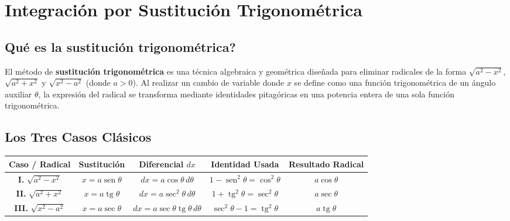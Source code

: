 \documentclass[12pt, letterpaper]{article}
\newcommand{\dtheta}{\,d\theta}
\DeclareMathOperator{\sen}{sen}
\DeclareMathOperator{\tg}{tg}
\begin{document}
\vspace{10pt}

\section{Integración por Sustitución Trigonométrica}

\subsection{\textquestiondown Qué es la sustitución trigonométrica?}
El método de \textbf{sustitución trigonométrica} es una técnica algebraica y geométrica diseñada para eliminar radicales de la forma $\sqrt{a^2-x^2}$, $\sqrt{a^2+x^2}$ y $\sqrt{x^2-a^2}$ (donde $a > 0$).
Al realizar un cambio de variable donde $x$ se define como una función trigonométrica de un ángulo auxiliar $\theta$, la expresión del radical se transforma mediante identidades pitagóricas en una potencia entera de una sola función trigonométrica.

\subsection{Los Tres Casos Clásicos}

\begin{cuadroinfo}
\small
\centering
\begin{tabular}{c c c c c}
\toprule
\textbf{Caso / Radical} & \textbf{Sustitución} & \textbf{Diferencial } $dx$ & \textbf{Identidad Usada} & \textbf{Resultado Radical} \\
\midrule
\textbf{I.} $\sqrt{a^2 - x^2}$ & $x = a\sen\theta$ & $dx = a\cos\theta\dtheta$ & $1 - \sen^2\theta = \cos^2\theta$ & $a\cos\theta$ \\[4pt]
\textbf{II.} $\sqrt{a^2 + x^2}$ & $x = a\tg\theta$ & $dx = a\sec^2\theta\dtheta$ & $1 + \tg^2\theta = \sec^2\theta$ & $a\sec\theta$ \\[4pt]
\textbf{III.} $\sqrt{x^2 - a^2}$ & $x = a\sec\theta$ & $dx = a\sec\theta\tg\theta\dtheta$ & $\sec^2\theta - 1 = \tg^2\theta$ & $a\tg\theta$ \\
\bottomrule
\end{tabular}
\end{cuadroinfo}
\end{document}
